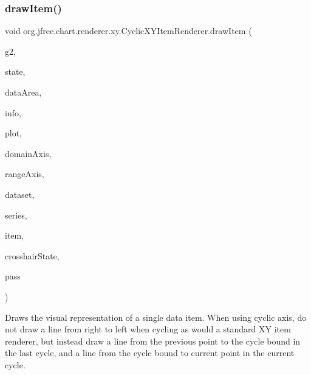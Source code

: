 \subsubsection{\texorpdfstring{draw\+Item()}{drawItem()}}
{\footnotesize\ttfamily void org.\+jfree.\+chart.\+renderer.\+xy.\+Cyclic\+X\+Y\+Item\+Renderer.\+draw\+Item (\begin{DoxyParamCaption}\item[{Graphics2D}]{g2,  }\item[{\mbox{\hyperlink{classorg_1_1jfree_1_1chart_1_1renderer_1_1xy_1_1_x_y_item_renderer_state}{X\+Y\+Item\+Renderer\+State}}}]{state,  }\item[{Rectangle2D}]{data\+Area,  }\item[{\mbox{\hyperlink{classorg_1_1jfree_1_1chart_1_1plot_1_1_plot_rendering_info}{Plot\+Rendering\+Info}}}]{info,  }\item[{\mbox{\hyperlink{classorg_1_1jfree_1_1chart_1_1plot_1_1_x_y_plot}{X\+Y\+Plot}}}]{plot,  }\item[{\mbox{\hyperlink{classorg_1_1jfree_1_1chart_1_1axis_1_1_value_axis}{Value\+Axis}}}]{domain\+Axis,  }\item[{\mbox{\hyperlink{classorg_1_1jfree_1_1chart_1_1axis_1_1_value_axis}{Value\+Axis}}}]{range\+Axis,  }\item[{\mbox{\hyperlink{interfaceorg_1_1jfree_1_1data_1_1xy_1_1_x_y_dataset}{X\+Y\+Dataset}}}]{dataset,  }\item[{int}]{series,  }\item[{int}]{item,  }\item[{\mbox{\hyperlink{classorg_1_1jfree_1_1chart_1_1plot_1_1_crosshair_state}{Crosshair\+State}}}]{crosshair\+State,  }\item[{int}]{pass }\end{DoxyParamCaption})}

Draws the visual representation of a single data item. When using cyclic axis, do not draw a line from right to left when cycling as would a standard XY item renderer, but instead draw a line from the previous point to the cycle bound in the last cycle, and a line from the cycle bound to current point in the current cycle.


